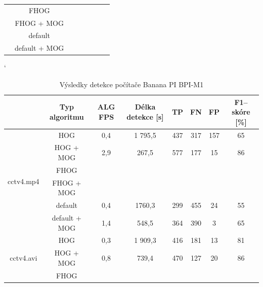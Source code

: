 \begin{table}[H]
\begin{tabular}{|c|c|c|c|c|c|c|c|}
                         & FHOG       		&         &               	  &    		&    	&    	& 		        \\ \cline{2-8} 
                         & FHOG + MOG 		&         &               	  &    		&    	&    	& 		        \\ \cline{2-8} 
                         & default	 		&         &               	  &    		&    	&    	& 		        \\ \cline{2-8} 
                         & default + MOG 	&         &               	  &    		&    	&    	& 		        \\ \hline
\end{tabular}
\end{table}


\begin{table}[H]
\catcode`
\centering
\caption{Výsledky detekce počítače Banana PI BPI-M1}
\label{resultTabBPI}
\begin{tabular}{|c|c|c|c|c|c|c|c|}
\hline
                         & Typ algoritmu	& ALG FPS & Délka detekce [s] & TP 	  & FN 	& FP 	& F1--skóre [\%] \\ \hline
\multirow{6}{*}{cctv4.mp4} & HOG      		&  0,4    &   1 795,5    	  & 437   & 317 & 157  	&   65     	 	  \\ \cline{2-8} 
                         & HOG + MOG  		&  2,9    &     267,5     	  & 577   & 177 & 15  	&   86     		  \\ \cline{2-8} 
                         & FHOG       		&         &               	  &    &    &    &          \\ \cline{2-8} 
                         & FHOG + MOG 		&         &               	  &    &    &    &          \\ \cline{2-8}  
                         & default	 		&  0,4    &    1760,3           & 299   & 455 & 24     &   55                \\ \cline{2-8}  
                         & default + MOG 	&  1,4    &     548,5           & 364   & 390 & 3      &   65                \\ \hline\hline 
\multirow{6}{*}{cctv4.avi} & HOG        	&  0,3    &   1 909,3     	  & 416	& 181 & 13   &   81     		       \\ \cline{2-8} 
                         & HOG + MOG  		&  0,8    &     739,4      	  & 470   & 127 & 20   &   86                  \\ \cline{2-8} 
                         & FHOG       		&         &               	  &    &    &    &          \\ \cline{2-8} 

\end{tabular}
\end{table}
